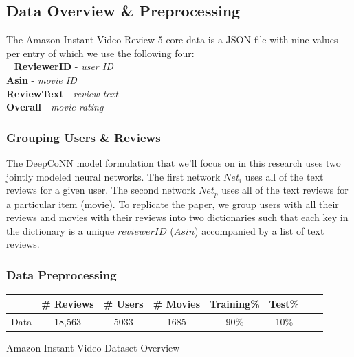 \documentclass[10pt,twocolumn,letterpaper]{article}
\begin{document}
\subsection{Data Overview \& Preprocessing}
The Amazon Instant Video Review 5-core data is a JSON file with nine values per entry of which we use the following four:\\
\ \newline
 \hspace*{10mm}  \textbf{ReviewerID} - \textit{user ID} \\ 
 \hspace*{10mm}  \textbf{Asin} - \textit{movie ID} \\
 \hspace*{10mm}  \textbf{ReviewText} - \textit{review text} \\
 \hspace*{10mm}  \textbf{Overall} - \textit{movie rating} 

\subsubsection{Grouping Users \& Reviews}
The DeepCoNN model formulation that we'll focus on in this research uses two jointly modeled neural networks. The first network $Net_{i}$ uses all of the text reviews for a given user. The second network $Net_{p}$ uses all of the text reviews for a particular item (movie). To replicate the paper, we group users with all their reviews and movies with their reviews into two dictionaries such that each key in the dictionary is a unique $reviewerID$ ($Asin$) accompanied by a list of text reviews. 

\subsubsection{Data Preprocessing}
\begin{exhibit}
\begin{center}
{\small
\begin{tabular}{l|ccccccc}
\hline
 & \# Reviews & \# Users & \# Movies & Training\% & Test\% \\
\hline
Data & 18,563  & 5033 & 1685 & 90\% & 10\%  \\
\hline
\end{tabular}
}
\end{center}
\caption{Amazon Instant Video Dataset Overview}
\end{exhibit}
\end{document}
